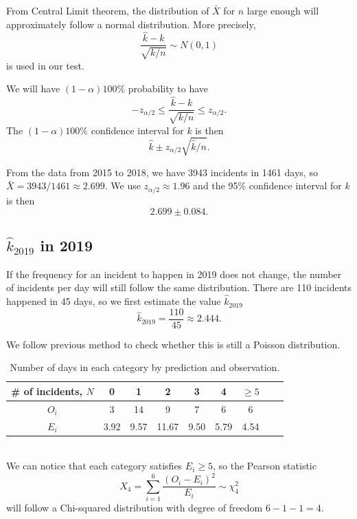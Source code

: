 \documentclass[11pt,a4paper,english]{article}
\begin{document}
From Central Limit theorem, the distribution of $\bar{X}$ for $n$ large enough will approximately follow a normal distribution. More precisely,
\begin{equation*}
	\frac{\hat{k}-k}{\sqrt{k/n}} \sim N(0,1)
\end{equation*}
is used in our test. 

We will have $(1-\alpha)100\%$ probability to have 
\begin{equation*}
	-z_{\alpha/2} \leq \frac{\hat{k}-k}{\sqrt{k/n}} \leq z_{\alpha/2}.
\end{equation*}
The $(1-\alpha)100\%$ confidence interval for $k$ is then 
\begin{equation*}
	\hat{k} \pm z_{\alpha/2}\sqrt{\hat{k}/n}.
\end{equation*}

From the data from 2015 to 2018, we have 3943 incidents in 1461 days, so $\bar{X} = 3943/1461 \approx 2.699$. We use $z_{\alpha/2} \approx 1.96$ and the 95\% confidence interval for $k$ is then 
\begin{equation*}
	2.699 \pm 0.084.
\end{equation*}

\subsection{$\hat{k}_{2019}$ in 2019}
If the frequency for an incident to happen in 2019 does not change, the number of incidents per day will still follow the same distribution. There are 110 incidents happened in 45 days, so we first estimate the value $\hat{k}_{2019}$
\begin{equation*}
	\hat{k}_{2019} = \frac{110}{45} \approx 2.444.
\end{equation*}

We follow previous method to check whether this is still a Poisson distribution.
\begin{table}[htbp]
	\centering
	\begin{tabular}{c|cccccccc}
		\hline
		\# of incidents, $N$ & 0 & 1 & 2 & 3 & 4 & $\geq 5$\\
		\hline
		$O_{i}$ & 3 & 14 & 9 & 7 & 6 & 6\\
		\hline
		$E_{i}$ & 3.92 & 9.57 & 11.67 & 9.50 & 5.79 & 4.54\\
		\hline
	\end{tabular}
	\caption{Number of days in each category by prediction and observation.}
\end{table}
\\We can notice that each category satisfies $E_{i} \geq 5$, so the Pearson statistic 
\begin{equation*}
X_{4} = \sum_{i = 1}^{6}\frac{(O_{i}-E_{i})^{2}}{E_{i}} \sim \chi^{2}_{4}
\end{equation*}
will follow a Chi-squared distribution with degree of freedom $6-1-1 = 4$.
\end{document}
